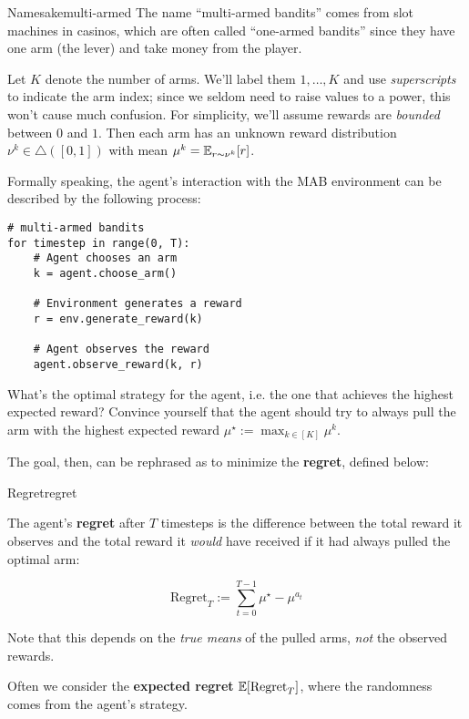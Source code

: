 \documentclass[\main/main]{subfiles}
\begin{document}
\begin{remark}{Namesake}{multi-armed}
    The name ``multi-armed bandits'' comes from slot machines in casinos, which are often called ``one-armed bandits'' since they have one arm (the lever) and take money from the player.
\end{remark}

Let $K$ denote the number of arms. We'll label them $1, \dots, K$ and use \emph{superscripts} to indicate the arm index; since we seldom need to raise values to a power, this won't cause much confusion. For simplicity, we'll assume rewards are \emph{bounded} between $0$ and $1$. Then each arm has an unknown reward distribution $\nu^k \in \triangle([0, 1])$ with mean $\mu^k = \operatorname*{\mathbb{E}}_{r \sim \nu^k} [r]$.

Formally speaking, the agent's interaction with the MAB environment can be described by the following process:

\begin{lstlisting}
# multi-armed bandits
for timestep in range(0, T):
    # Agent chooses an arm
    k = agent.choose_arm()
    
    # Environment generates a reward
    r = env.generate_reward(k)
    
    # Agent observes the reward
    agent.observe_reward(k, r)
\end{lstlisting}


What's the optimal strategy for the agent, i.e. the one that achieves the highest expected reward? Convince yourself that the agent should try to always pull the arm with the highest expected reward $\mu^\star := \max_{k \in [K]} \mu^k$.

The goal, then, can be rephrased as to minimize the \textbf{regret}, defined below:

\begin{definition}{Regret}{regret}
    
The agent's \textbf{regret} after $T$ timesteps is the difference between the total reward it observes and the total reward it \emph{would} have received if it had always pulled the optimal arm:

\begin{equation}
    \text{Regret}_T := \sum_{t=0}^{T-1} \mu^\star - \mu^{a_t}
\end{equation}

Note that this depends on the \emph{true means} of the pulled arms, \emph{not} the observed rewards.

Often we consider the \textbf{expected regret} $\operatorname*{\mathbb{E}}[\text{Regret}_T]$, where the randomness comes from the agent's strategy.

\end{definition}
\end{document}
